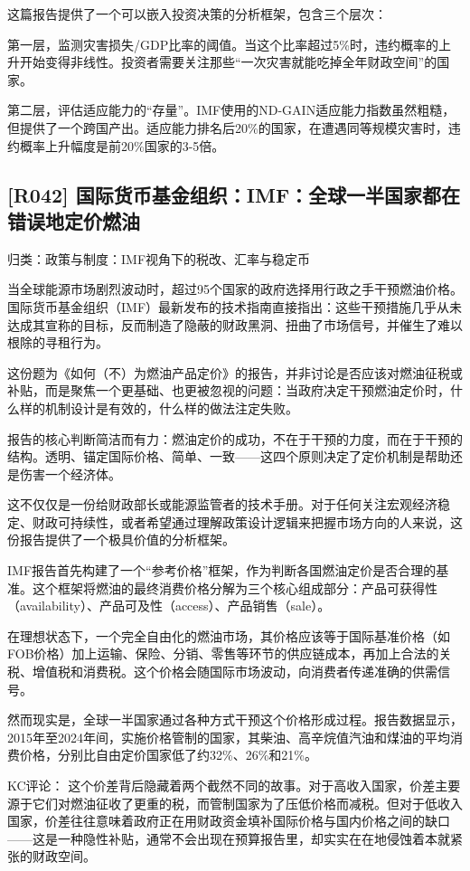 \documentclass[11pt]{ctexart}
\begin{document}
这篇报告提供了一个可以嵌入投资决策的分析框架，包含三个层次：

第一层，监测灾害损失/GDP比率的阈值。当这个比率超过5\%时，违约概率的上升开始变得非线性。投资者需要关注那些“一次灾害就能吃掉全年财政空间”的国家。

第二层，评估适应能力的“存量”。IMF使用的ND-GAIN适应能力指数虽然粗糙，但提供了一个跨国产出。适应能力排名后20\%的国家，在遭遇同等规模灾害时，违约概率上升幅度是前20\%国家的3-5倍。

\subsection{[R042] 国际货币基金组织：IMF：全球一半国家都在错误地定价燃油}
{\small\color{refgray}归类：政策与制度：IMF视角下的税改、汇率与稳定币}

当全球能源市场剧烈波动时，超过95个国家的政府选择用行政之手干预燃油价格。国际货币基金组织（IMF）最新发布的技术指南直接指出：这些干预措施几乎从未达成其宣称的目标，反而制造了隐蔽的财政黑洞、扭曲了市场信号，并催生了难以根除的寻租行为。

这份题为《如何（不）为燃油产品定价》的报告，并非讨论是否应该对燃油征税或补贴，而是聚焦一个更基础、也更被忽视的问题：当政府决定干预燃油定价时，什么样的机制设计是有效的，什么样的做法注定失败。

报告的核心判断简洁而有力：燃油定价的成功，不在于干预的力度，而在于干预的结构。透明、锚定国际价格、简单、一致——这四个原则决定了定价机制是帮助还是伤害一个经济体。

这不仅仅是一份给财政部长或能源监管者的技术手册。对于任何关注宏观经济稳定、财政可持续性，或者希望通过理解政策设计逻辑来把握市场方向的人来说，这份报告提供了一个极具价值的分析框架。

IMF报告首先构建了一个“参考价格”框架，作为判断各国燃油定价是否合理的基准。这个框架将燃油的最终消费价格分解为三个核心组成部分：产品可获得性（availability）、产品可及性（access）、产品销售（sale）。

在理想状态下，一个完全自由化的燃油市场，其价格应该等于国际基准价格（如FOB价格）加上运输、保险、分销、零售等环节的供应链成本，再加上合法的关税、增值税和消费税。这个价格会随国际市场波动，向消费者传递准确的供需信号。

然而现实是，全球一半国家通过各种方式干预这个价格形成过程。报告数据显示，2015年至2024年间，实施价格管制的国家，其柴油、高辛烷值汽油和煤油的平均消费价格，分别比自由定价国家低了约32\%、26\%和21\%。

KC评论： 这个价差背后隐藏着两个截然不同的故事。对于高收入国家，价差主要源于它们对燃油征收了更重的税，而管制国家为了压低价格而减税。但对于低收入国家，价差往往意味着政府正在用财政资金填补国际价格与国内价格之间的缺口——这是一种隐性补贴，通常不会出现在预算报告里，却实实在在地侵蚀着本就紧张的财政空间。
\end{document}

